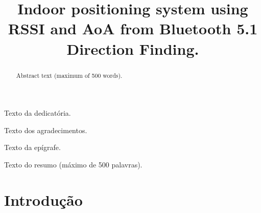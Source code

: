 \documentclass[openright]{normas-utf-tex} %
\title{Indoor positioning system using RSSI and AoA from Bluetooth 5.1 Direction Finding.} %
\begin{document}
\pdfstringdefDisableCommands{%
	\let\MakeUppercase\relax
}
\capa %
\folhaderosto %


%


\begin{dedicatoria}
Texto da dedicat\'oria.
\end{dedicatoria}

\begin{agradecimentos}
Texto dos agradecimentos.
\end{agradecimentos}

\begin{epigrafe}
Texto da ep\'igrafe.
\end{epigrafe}

\begin{resumo}
Texto do resumo (m\'aximo de 500 palavras).
\end{resumo}

\begin{abstract}
Abstract text (maximum of 500 words).
\end{abstract}

\listadefiguras %
\listadetabelas %
\listadesiglas %
\listadesimbolos %

\sumario %




%
%
%
%


\setcounter{page}{11}

\chapter{Introdução}
\label{chap:introducao}
\end{document}
